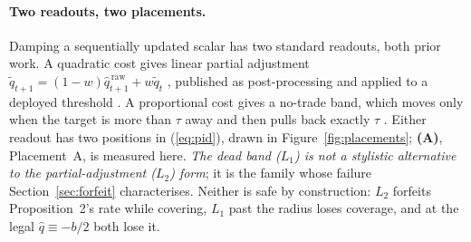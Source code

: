 \paragraph{Two readouts, two placements.} Damping a sequentially updated scalar
has two standard readouts, both prior work. A quadratic cost gives linear partial adjustment
$\tilde{q}_{t+1} = (1-w)\hat{q}^{\,\mathrm{raw}}_{t+1} +
w\tilde{q}_t$ \citep{garleanu2013dynamic}, published as post-processing
\citep{godahewa2025stability} and applied to a deployed threshold
\citep[Eq.~13]{binny2025whomoved}. A proportional cost gives a no-trade band, which moves only when the
target is more than $\tau$ away and then pulls back exactly $\tau$
\citep{constantinides1986,davis1990}. Either readout has two positions in (\ref{eq:pid}), drawn
in Figure~\ref{fig:placements}; \textbf{(A)}, Placement~A, is measured here.
\emph{The dead band ($L_1$) is not a stylistic alternative to the partial-adjustment ($L_2$) form}; it
is the family whose failure Section~\ref{sec:forfeit} characterises. Neither is safe by construction:
$L_2$ forfeits Proposition~2's
rate while covering, $L_1$ past the radius loses coverage, and at the legal $\hat{q} \equiv
-b/2$ both lose it.

